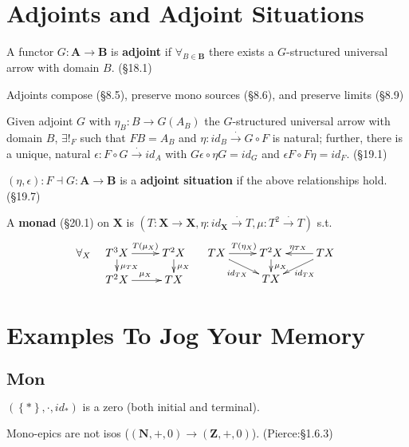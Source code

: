 \documentclass[10pt,twocolumn,letterpaper]{article}
\newcommand{\set}[1]{\left\{{#1}\right\}}
\newcommand{\natto}{\overset{\cdot}{\to}}
\newcommand{\defn}[1]{{\bf #1}}
\begin{document}
\section{Adjoints and Adjoint Situations}

  A functor $G : \mathbf{A} \to \mathbf{B}$ is \defn{adjoint} if
  $\forall_{B \in \mathbf{B}}$ there exists a $G$-structured universal
  arrow with domain $B$.  (\S18.1)

  Adjoints compose (\S8.5), preserve mono sources (\S8.6), and preserve
  limits (\S8.9)

  Given adjoint $G$ with $\eta_B : B \to G(A_B)$ the $G$-structured
  universal arrow with domain $B$, $\exists!_F$ such that $FB = A_B$ and
  $\eta : id_B \natto G \circ F$ is natural; further, there is a unique,
  natural $\epsilon : F \circ G \natto id_A$ with $G\epsilon \circ \eta G =
  id_G$ and $\epsilon F \circ F \eta = id_F$.  (\S19.1)

  $(\eta,\epsilon) : F \dashv G : \mathbf{A} \to \mathbf{B}$ is a
  \defn{adjoint situation} if the above relationships hold. (\S19.7)

  A \defn{monad} (\S20.1) on $\mathbf{X}$ is $(T : \mathbf{X} \to \mathbf{X},
  \eta : id_{\mathbf{X}} \natto T, \mu : T^2 \natto T)$ s.t.
  \[\forall_X \quad
  \xymatrix@R=10pt{
    T^3X \ar[r]^{T(\mu_X)} \ar[d]^{\mu_{TX}} & T^2X \ar[d]^{\mu_{X}} \\
    T^2X \ar[r]^{\mu_X}                 & TX
  } \quad \xymatrix@R=10pt{
    TX \ar[r]^{T(\eta_X)} \ar[dr]_{id_{TX}} & T^2X \ar[d]^{\mu_X} & TX \ar[l]_{\eta_{TX}} \ar[dl]^{id_{TX}} \\
        & TX & 
  }\]


\pagebreak\appendix\section{Examples To Jog Your Memory}

\subsection{$\mathbf{Mon}$}

  $(\set{*},\cdot,id_*)$ is a zero (both initial and terminal).

  Mono-epics are not isos ($(\mathbf{N},+,0) \to (\mathbf{Z},+,0)$).
  (Pierce:\S1.6.3)
\end{document}
